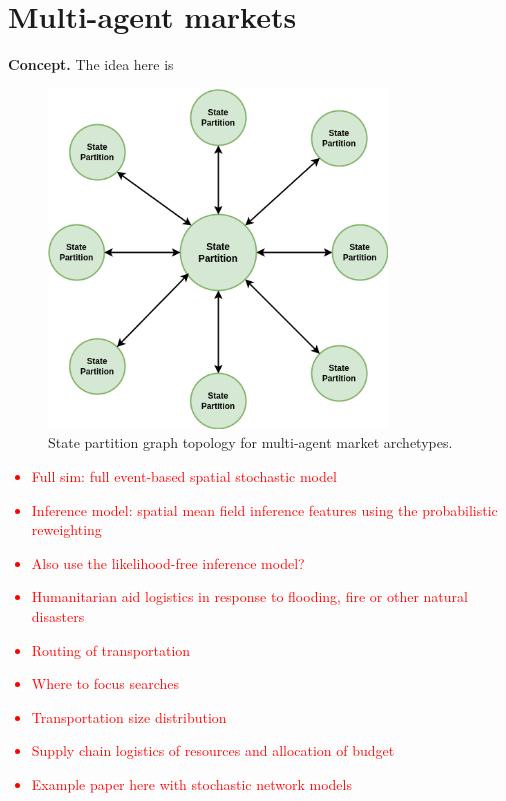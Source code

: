 \chapter{\sffamily Multi-agent markets}

{\bfseries\sffamily Concept.} The idea here is 

\begin{figure}[h]
\centering
\includegraphics[width=9cm]{images/chapter-10-state-partition-graph.drawio.png}
\caption{State partition graph topology for multi-agent market archetypes.}
\label{fig:state-partition-graph-multi-agent-markets}
\end{figure}

\textcolor{red}{
\begin{itemize}
\item{Full sim: full event-based spatial stochastic model}
\item{Inference model: spatial mean field inference features using the probabilistic reweighting }
\item{Also use the likelihood-free inference model?}
\end{itemize}
}

\textcolor{red}{
\begin{itemize}
\item{Humanitarian aid logistics in response to flooding, fire or other natural disasters}
\item{Routing of transportation}
\item{Where to focus searches}
\item{Transportation size distribution}
\item{Supply chain logistics of resources and allocation of budget}
\item{Example paper here with stochastic network models~\cite{alem2016stochastic}}
\end{itemize}
}